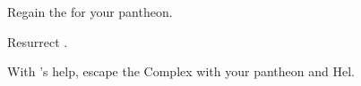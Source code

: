 \documentclass[char]{guardians}
\begin{document}
\name{\cIsis{}}














\begin{itemz}[Goals]
  \item Regain the \iNecro{} for your pantheon.
  \item Resurrect \cSet{}.
  \item With \cSet{}'s help, escape the Complex with your pantheon and Hel.
  \item %
  \item %
\end{itemz}

\begin{contacts}
  \contact{\cOsiris{}}
  \contact{\cAnubis{}}
  \contact{\cHel{}}
  \contact{\cCaretaker{}}
  \contact{\cWarden{}}
\end{contacts}
\end{document}
